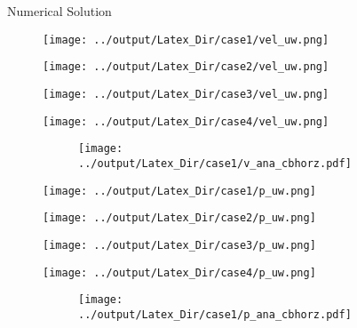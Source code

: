 \documentclass[10pt,aspectratio=169]{beamer}
\begin{document}
\begin{frame}{Numerical Solution}
	\vspace{-0.32in}
	\begin{figure}[!htb]
		\begin{multicols}{4}
			\texttt{[image: ../output/Latex\_Dir/case1/vel\_uw.png]}\par
			\hspace{0.75in}
			\texttt{[image: ../output/Latex\_Dir/case2/vel\_uw.png]}\par
			\hspace{1.5in}
			\texttt{[image: ../output/Latex\_Dir/case3/vel\_uw.png]}\par
			\hspace{2.25in}
			\texttt{[image: ../output/Latex\_Dir/case4/vel\_uw.png]}
		\end{multicols}
		\vspace{-0.29in}
		\begin{figure}
			\hspace{0.1in} 
			\texttt{[image: ../output/Latex\_Dir/case1/v\_ana\_cbhorz.pdf]}
		\end{figure}
	\end{figure}
	
	\begin{figure}[!htb]
		\vspace{-0.5in}
		\begin{multicols}{4}
			\texttt{[image: ../output/Latex\_Dir/case1/p\_uw.png]}\par
			\hspace{0.75in}
			\texttt{[image: ../output/Latex\_Dir/case2/p\_uw.png]}\par
			\hspace{1.5in}
			\texttt{[image: ../output/Latex\_Dir/case3/p\_uw.png]}\par
			\hspace{2.25in}
			\texttt{[image: ../output/Latex\_Dir/case4/p\_uw.png]}
		\end{multicols}
		\vspace{-0.27in}
		\begin{figure}
			\hspace{0.1in} 
			\texttt{[image: ../output/Latex\_Dir/case1/p\_ana\_cbhorz.pdf]}
		\end{figure}
	\end{figure}
\end{frame}
\end{document}
